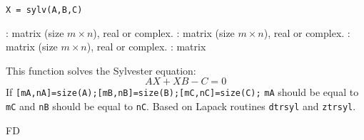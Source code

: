 
\begin{mandesc}
\end{mandesc}

\begin{calling_sequence}
\begin{verbatim}
X = sylv(A,B,C)
\end{verbatim}
\end{calling_sequence}
\begin{parameters}
  \begin{varlist}
    : matrix (size $m \times n$), real or complex.
    : matrix (size $m \times n$), real or complex.
    : matrix (size $m \times n$), real or complex.
    : matrix
  \end{varlist}
\end{parameters}

\begin{mandescription}
This function solves the Sylvester equation:
$$
 A X + X B - C = 0
$$
If \verb![mA,nA]=size(A);[mB,nB]=size(B);[mC,nC]=size(C);!
\verb!mA! should be equal to \verb!mC! and \verb!nB!  should be equal to
\verb!nC!. 
Based on Lapack routines \verb!dtrsyl! and \verb!ztrsyl!.
\end{mandescription}

\begin{examples}
  \begin{program}
  \end{program}
\end{examples}


\begin{authors}
   FD
\end{authors}
